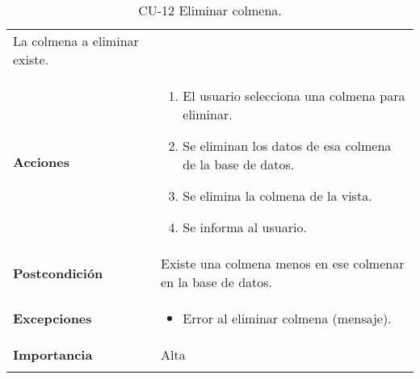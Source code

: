 \begin{longtable}[]{@{}ll@{}}
\begin{minipage}[t]{0.65\columnwidth}
La colmena a eliminar existe.\strut
\end{minipage}\tabularnewline
\begin{minipage}[t]{0.29\columnwidth}\raggedright\strut
\textbf{Acciones}\strut
\end{minipage} & \begin{minipage}[t]{0.65\columnwidth}\raggedright\strut
\begin{enumerate}
\def\labelenumi{\arabic{enumi}.}
\tightlist
\item
  El usuario selecciona una colmena para eliminar.
\item
  Se eliminan los datos de esa colmena de la base de datos.
\item
  Se elimina la colmena de la vista.
\item
  Se informa al usuario.
\end{enumerate}\strut
\end{minipage}\tabularnewline
\begin{minipage}[t]{0.29\columnwidth}\raggedright\strut
\textbf{Postcondición}\strut
\end{minipage} & \begin{minipage}[t]{0.65\columnwidth}\raggedright\strut
Existe una colmena menos en ese colmenar en la base de datos.\strut
\end{minipage}\tabularnewline
\begin{minipage}[t]{0.29\columnwidth}\raggedright\strut
\textbf{Excepciones}\strut
\end{minipage} & \begin{minipage}[t]{0.65\columnwidth}\raggedright\strut
\begin{itemize}
\tightlist
\item
  Error al eliminar colmena (mensaje).
\end{itemize}\strut
\end{minipage}\tabularnewline
\begin{minipage}[t]{0.29\columnwidth}\raggedright\strut
\textbf{Importancia}\strut
\end{minipage} & \begin{minipage}[t]{0.65\columnwidth}\raggedright\strut
Alta\strut
\end{minipage}\tabularnewline
\bottomrule
\caption{CU-12 Eliminar colmena.}
\end{longtable}

